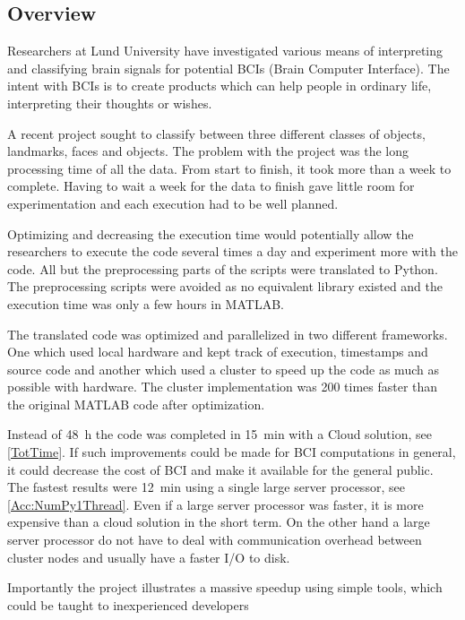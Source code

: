 \documentclass[12pt, a4paper]{article}
\begin{document}
\subsection{Overview}

Researchers at Lund University have investigated various means of interpreting and classifying brain signals for potential BCIs (Brain Computer Interface). 
The intent with BCIs is to create products which can help people in ordinary life, interpreting their thoughts or wishes.

A recent project sought to classify between three different classes of objects, landmarks, faces and objects.
The problem with the project was the long processing time of all the data.
From start to finish, it took more than a week to complete.
Having to wait a week for the data to finish gave little room for experimentation and each execution had to be well planned.

Optimizing and decreasing the execution time would potentially allow the researchers to execute the code several times a day and experiment more with the code.
All but the preprocessing parts of the scripts were translated to Python.
The preprocessing scripts were avoided as no equivalent library existed and the execution time was only a few hours in MATLAB.

The translated code was optimized and parallelized in two different frameworks.
One which used local hardware and kept track of execution, timestamps and source code and another which used a cluster to speed up the code as much as possible with hardware.
The cluster implementation was 200 times faster than the original MATLAB code after optimization.

Instead of \SI{48}{\hour} the code was completed in \SI{15}{\minute} with a Cloud solution, see \cref{TotTime}.
If such improvements could be made for BCI computations in general, it could decrease the cost of BCI and make it available for the general public.
The fastest results were \SI{12}{\minute} using a single large server processor, see \cref{Acc:NumPy1Thread}.
Even if a large server processor was faster, it is more expensive than a cloud solution in the short term.
On the other hand a large server processor do not have to deal with communication overhead between cluster nodes and usually have a faster I/O to disk.

Importantly the project illustrates a massive speedup using simple tools, which could be taught to inexperienced developers
\end{document}
